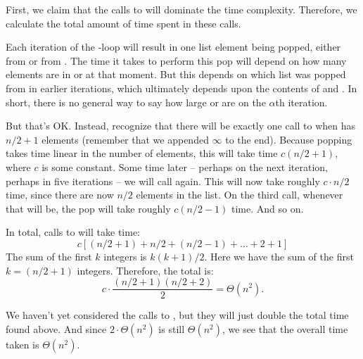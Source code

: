\begin{prob}
\begin{subprobset}
\begin{subprob}
            \begin{soln}
                First, we claim that the calls to  will dominate
                the time complexity. Therefore, we calculate the total amount
                of time spent in these calls.

                Each iteration of the -loop will result in one
                list element being popped, either from  or
                from . The time it takes to perform this pop
                will depend on how many elements are in  or
                 at that moment. But this depends on which
                list was popped from in earlier iterations, which
                ultimately depends upon the contents of  and
                .  In short, there is no general way to say
                how large  or  are on the
                $\alpha$th iteration.

                But that's OK. Instead, recognize that there will be exactly
                one call to  when  has
                $n/2 + 1$ elements (remember that we appended $\infty$ to
                the end). Because popping takes time linear in the number
                of elements, this will take time $c(n/2 + 1)$, where $c$ is
                some constant. Some time later -- perhaps on the next
                iteration, perhaps in five iterations -- we will call
                 again. This will now take roughly $c\cdot n/2$
                time, since there are now $n/2$ elements in the list. On
                the third call, whenever that will be, the pop will take
                roughly $c(n/2 - 1)$ time. And so on.

                In total, calls to  will take time:
                \[
                    c \left[\left(n/2 + 1\right) + n/2 + (n/2 - 1) + \ldots +  2 + 1 \right]
                \]
                The sum of the first $k$ integers is $k(k+1)/2$. Here we have the sum
                of the first $k = (n/2 + 1)$ integers. Therefore, the total is:
                \[
                    c\cdot \frac{(n/2 + 1)(n/2 + 2)}{2} = \Theta(n^2).
                \]

                We haven't yet considered the calls to ,
                but they will just double the total time found above. And
                since $2 \cdot \Theta(n^2)$ is still $\Theta(n^2)$, we
                see that the overall time taken is $\Theta(n^2)$.
            \end{soln}
        \end{subprob}


\end{subprobset}
\end{prob}
